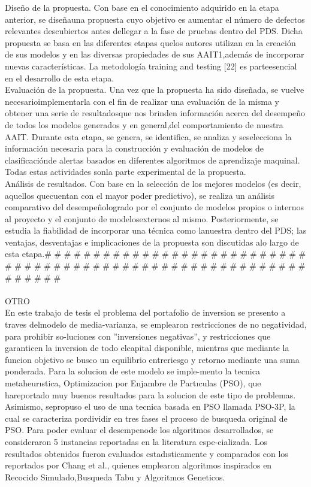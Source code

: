 Diseño de la propuesta. Con base en el conocimiento adquirido en la etapa anterior, se diseñauna propuesta cuyo objetivo es aumentar el número de defectos relevantes descubiertos antes dellegar a la fase de pruebas dentro del PDS. Dicha propuesta se basa en las diferentes etapas quelos autores utilizan en la creación de sus modelos y en las diversas propiedades de sus AAIT1,además de incorporar nuevas características. La metodología training and testing [22] es parteesencial en el desarrollo de esta etapa.\\
Evaluación de la propuesta. Una vez que la propuesta ha sido diseñada, se vuelve necesarioimplementarla con el fin de realizar una evaluación de la misma y obtener una serie de resultadosque nos brinden información acerca del desempeño de todos los modelos generados y en general,del comportamiento de nuestra AAIT. Durante esta etapa, se genera, se identifica, se analiza y seselecciona la información necesaria para la construcción y evaluación de modelos de clasificaciónde alertas basados en diferentes algoritmos de aprendizaje maquinal. Todas estas actividades sonla parte experimental de la propuesta.\\
Análisis de resultados. Con base en la selección de los mejores modelos (es decir, aquellos quecuentan con el mayor poder predictivo), se realiza un análisis comparativo del desempeñologrado por el conjunto de modelos propios o internos al proyecto y el conjunto de modelosexternos al mismo. Posteriormente, se estudia la fiabilidad de incorporar una técnica como lanuestra dentro del PDS; las ventajas, desventajas e implicaciones de la propuesta son discutidas alo largo de esta etapa.\# \# \# \# \# \# \# \# \# \# \# \# \# \# \# \# \# \# \# \# \# \# \# \# \# \# \# \# \# \# \# \# \# \# \# \# \# \# \# \# \# \# \# \# \# \# \# \# \# \# \# \# \# \# \# \# \# \# \# \# \# \# \# \#\\\\
OTRO\\
En este trabajo de tesis el problema del portafolio de inversion se presento a traves delmodelo de media-varianza, se emplearon restricciones de no negatividad, para prohibir so-luciones con ”inversiones negativas”, y restricciones que garanticen la inversion de todo elcapital  disponible,  mientras  que  mediante  la  funcion  objetivo  se  busco  un  equilibrio  entreriesgo y retorno mediante una suma ponderada. Para la solucion de este modelo se imple-mento la tecnica metaheurıstica, Optimizacion por Enjambre de Partıculas (PSO), que hareportado muy buenos resultados para la solucion de este tipo de problemas. Asimismo, sepropuso el uso de una tecnica basada en PSO llamada PSO-3P, la cual se caracteriza pordividir en tres fases el proceso de busqueda original de PSO. Para poder evaluar el desempenode los algoritmos desarrollados, se consideraron 5 instancias reportadas en la literatura espe-cializada. Los resultados obtenidos fueron evaluados estadısticamente y comparados con los reportados por Chang et al., quienes emplearon algoritmos inspirados en Recocido Simulado,Busqueda Tabu y Algoritmos Geneticos.\\
